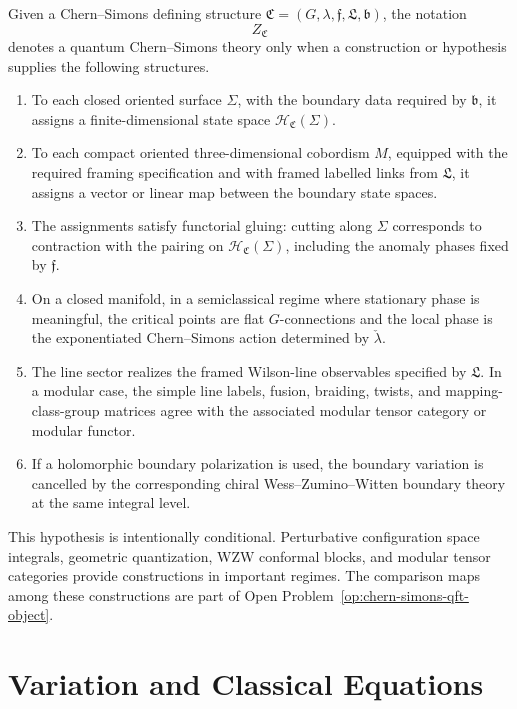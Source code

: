 \begin{hypothesis}
\label{hyp:quantum-chern-simons-theory}
Given a Chern--Simons defining structure
\(\mathfrak C=(G,\lambda,\mathfrak f,\mathfrak L,\mathfrak b)\), the notation
\[
  Z_{\mathfrak C}
\]
denotes a quantum Chern--Simons theory only when a construction or hypothesis
supplies the following structures.
\begin{enumerate}[label=\textup{(\roman*)}]
\item To each closed oriented surface \(\Sigma\), with the boundary data
required by \(\mathfrak b\), it assigns a finite-dimensional state space
\(\mathcal H_{\mathfrak C}(\Sigma)\).
\item To each compact oriented three-dimensional cobordism \(M\), equipped
with the required framing specification and with framed labelled links from
\(\mathfrak L\), it assigns a vector or linear map between the boundary state
spaces.
\item The assignments satisfy functorial gluing: cutting along \(\Sigma\)
corresponds to contraction with the pairing on
\(\mathcal H_{\mathfrak C}(\Sigma)\), including the anomaly phases fixed by
\(\mathfrak f\).
\item On a closed manifold, in a semiclassical regime where stationary phase
is meaningful, the critical points are flat \(G\)-connections and the local
phase is the exponentiated Chern--Simons action determined by
\(\check\lambda\).
\item The line sector realizes the framed Wilson-line observables specified
by \(\mathfrak L\).  In a modular case, the simple line labels, fusion,
braiding, twists, and mapping-class-group matrices agree with the associated
modular tensor category or modular functor.
\item If a holomorphic boundary polarization is used, the boundary variation
is cancelled by the corresponding chiral Wess--Zumino--Witten boundary theory
at the same integral level.
\end{enumerate}
This hypothesis is intentionally conditional.  Perturbative configuration
space integrals, geometric quantization, WZW conformal blocks, and modular
tensor categories provide constructions in important regimes.  The comparison
maps among these constructions are part of
Open Problem~\ref{op:chern-simons-qft-object}.
\end{hypothesis}

\section{Variation and Classical Equations}

